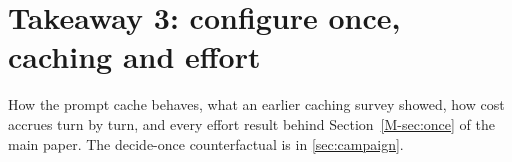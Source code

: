 \section{Takeaway 3: configure once, caching and effort}\label{sec:d}

How the prompt cache behaves, what an earlier caching survey showed, how cost accrues turn by turn, and every
effort result behind Section~\ref{M-sec:once} of the main paper. The decide-once counterfactual is in
\cref{sec:campaign}.






